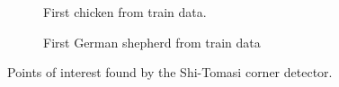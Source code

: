 \begin{figure}[ht]
    \centering
    \begin{subfigure}{.35\textwidth}
        \centering
        \captionsetup{width=0.9\linewidth}
        \captionsetup{justification=centering}
        \caption{First chicken from train data.}
    \end{subfigure}
    \hspace{1cm}
    \begin{subfigure}{.52\textwidth}
        \centering
        \captionsetup{width=0.9\linewidth}
        \captionsetup{justification=centering}
        \caption{First German shepherd from train data}
    \end{subfigure}
    \captionsetup{width=0.8\linewidth}
    \captionsetup{justification=centering}
    \caption{Points of interest found by the Shi-Tomasi corner detector.}
    \label{fig:1-poi}
\end{figure}


